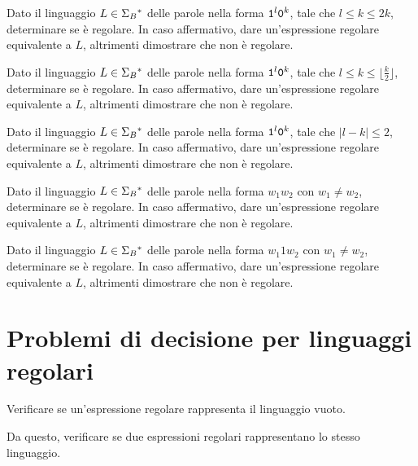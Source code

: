 \begin{Exercise}\label{exe:pump-01entrodoppio}
Dato il linguaggio $L\in\Sigma_{B}{}^{\ast}$ delle parole nella forma $\mathtt{1}^{l}\mathtt{0}^{k}$, tale che $l\le k\le 2k$,
determinare se è
regolare.
In  caso affermativo, dare un'espressione regolare equivalente a $L$, altrimenti dimostrare che non è regolare.
\end{Exercise}

\begin{Exercise}\label{exe:pump-01entrodoppio2}
Dato il linguaggio $L\in\Sigma_{B}{}^{\ast}$ delle parole nella forma $\mathtt{1}^{l}\mathtt{0}^{k}$, tale che $l\le k\le \lfloor
\frac{k}{2} \rfloor$,
determinare se è
regolare.
In  caso affermativo, dare un'espressione regolare equivalente a $L$, altrimenti dimostrare che non è regolare.
\end{Exercise}


\begin{Exercise}\label{exe:pump-01absdiff}
Dato il linguaggio $L\in\Sigma_{B}{}^{\ast}$ delle parole nella forma $\mathtt{1}^{l}\mathtt{0}^{k}$, tale che $|l - k| \le 2$,
determinare se è
regolare.
In  caso affermativo, dare un'espressione regolare equivalente a $L$, altrimenti dimostrare che non è regolare.
\end{Exercise}


\begin{Exercise}\label{exe:pump-noncopie}
Dato il linguaggio $L\in\Sigma_{B}{}^{\ast}$ delle parole nella forma $w_{1}w_{2}$ con $w_{1}\neq w_{2}$, determinare se è
regolare.
In  caso affermativo, dare un'espressione regolare equivalente a $L$, altrimenti dimostrare che non è regolare.
\end{Exercise}


\begin{Exercise}\label{exe:pump-noncopiecon1}
Dato il linguaggio $L\in\Sigma_{B}{}^{\ast}$ delle parole nella forma $w_{1}1w_{2}$ con $w_{1}\neq w_{2}$, determinare se è
regolare.
In  caso affermativo, dare un'espressione regolare equivalente a $L$, altrimenti dimostrare che non è regolare.
\end{Exercise}

\section{Problemi di decisione per linguaggi regolari}
\label{sec:problemi-decisione-ER}

Verificare se un'espressione regolare rappresenta il linguaggio vuoto.

Da questo, verificare se due espressioni regolari rappresentano lo stesso linguaggio.

